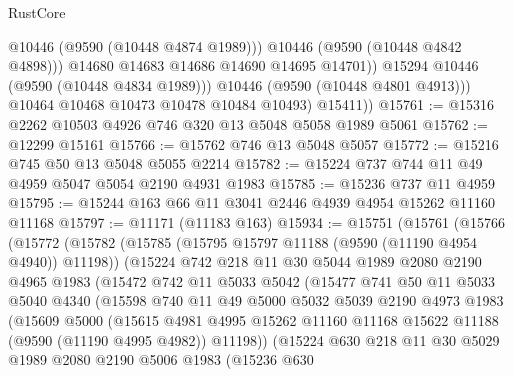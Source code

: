 \begin{lexlean}{RustCore}
\begin{coremodule}
                      @10446
                      (@9590 (@10448 @4874 @1989)))
                    @10446
                    (@9590 (@10448 @4842 @4898)))
                  @14680
                  @14683
                  @14686
                  @14690
                  @14695
                  @14701))
              @15294
              @10446
              (@9590 (@10448 @4834 @1989)))
            @10446
            (@9590 (@10448 @4801 @4913)))
          @10464
          @10468
          @10473
          @10478
          @10484
          @10493)
        @15411))
@15761 := @15316 @2262 @10503 @4926 @746 @320 @13 @5048 @5058 @1989 @5061
@15762 := @12299 @15161
@15766 := @15762 @746 @13 @5048 @5057
@15772 := @15216 @745 @50 @13 @5048 @5055 @2214
@15782 := @15224 @737 @744 @11 @49 @4959 @5047 @5054 @2190 @4931 @1983
@15785 := @15236 @737 @11 @4959
@15795 := @15244 @163 @66 @11 @3041 @2446 @4939 @4954 @15262 @11160 @11168
@15797 := @11171 (@11183 @163)
@15934 := @15751
    (@15761
      (@15766
        (@15772
          (@15782
            (@15785 (@15795 @15797 @11188 (@9590 (@11190 @4954 @4940)) @11198))
            (@15224
              @742
              @218
              @11
              @30
              @5044
              @1989
              @2080
              @2190
              @4965
              @1983
              (@15472
                @742
                @11
                @5033
                @5042
                (@15477
                  @741
                  @50
                  @11
                  @5033
                  @5040
                  @4340
                  (@15598
                    @740
                    @11
                    @49
                    @5000
                    @5032
                    @5039
                    @2190
                    @4973
                    @1983
                    (@15609
                      @5000
                      (@15615
                        @4981
                        @4995
                        @15262
                        @11160
                        @11168
                        @15622
                        @11188
                        (@9590 (@11190 @4995 @4982))
                        @11198))
                    (@15224
                      @630
                      @218
                      @11
                      @30
                      @5029
                      @1989
                      @2080
                      @2190
                      @5006
                      @1983
                      (@15236
                        @630

\end{coremodule}
\end{lexlean}

